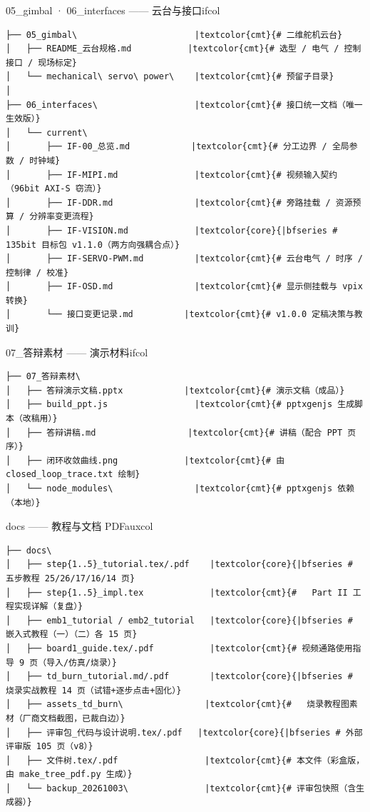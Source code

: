 \documentclass[10pt]{ctexart}
\begin{document}
\vspace{2.2mm}
\begin{sectbox}{05\_gimbal · 06\_interfaces —— 云台与接口}{ifcol}
\begin{Verbatim}[fontsize=\scriptsize, commandchars=\|\{\}]
├── 05_gimbal\                       |textcolor{cmt}{# 二维舵机云台}
│   ├── README_云台规格.md           |textcolor{cmt}{# 选型 / 电气 / 控制接口 / 现场标定}
│   └── mechanical\ servo\ power\    |textcolor{cmt}{# 预留子目录}
│
├── 06_interfaces\                   |textcolor{cmt}{# 接口统一文档（唯一生效版）}
│   └── current\
│       ├── IF-00_总览.md            |textcolor{cmt}{# 分工边界 / 全局参数 / 时钟域}
│       ├── IF-MIPI.md               |textcolor{cmt}{# 视频输入契约（96bit AXI-S 窃流）}
│       ├── IF-DDR.md                |textcolor{cmt}{# 旁路挂载 / 资源预算 / 分辨率变更流程}
│       ├── IF-VISION.md             |textcolor{core}{|bfseries # 135bit 目标包 v1.1.0（两方向强耦合点）}
│       ├── IF-SERVO-PWM.md          |textcolor{cmt}{# 云台电气 / 时序 / 控制律 / 校准}
│       ├── IF-OSD.md                |textcolor{cmt}{# 显示侧挂载与 vpix 转换}
│       └── 接口变更记录.md          |textcolor{cmt}{# v1.0.0 定稿决策与教训}
\end{Verbatim}
\end{sectbox}
\vspace{2.2mm}
\begin{sectbox}{07\_答辩素材 —— 演示材料}{ifcol}
\begin{Verbatim}[fontsize=\scriptsize, commandchars=\|\{\}]
├── 07_答辩素材\
│   ├── 答辩演示文稿.pptx            |textcolor{cmt}{# 演示文稿（成品）}
│   ├── build_ppt.js                 |textcolor{cmt}{# pptxgenjs 生成脚本（改稿用）}
│   ├── 答辩讲稿.md                  |textcolor{cmt}{# 讲稿（配合 PPT 页序）}
│   ├── 闭环收敛曲线.png             |textcolor{cmt}{# 由 closed_loop_trace.txt 绘制}
│   └── node_modules\                |textcolor{cmt}{# pptxgenjs 依赖（本地）}
\end{Verbatim}
\end{sectbox}
\vspace{2.2mm}
\begin{sectbox}{docs —— 教程与文档 PDF}{auxcol}
\begin{Verbatim}[fontsize=\scriptsize, commandchars=\|\{\}]
├── docs\
│   ├── step{1..5}_tutorial.tex/.pdf    |textcolor{core}{|bfseries # 五步教程 25/26/17/16/14 页}
│   ├── step{1..5}_impl.tex             |textcolor{cmt}{#   Part II 工程实现详解（复盘）}
│   ├── emb1_tutorial / emb2_tutorial   |textcolor{core}{|bfseries # 嵌入式教程（一）（二）各 15 页}
│   ├── board1_guide.tex/.pdf           |textcolor{cmt}{# 视频通路使用指导 9 页（导入/仿真/烧录）}
│   ├── td_burn_tutorial.md/.pdf        |textcolor{core}{|bfseries # 烧录实战教程 14 页（试错+逐步点击+固化）}
│   ├── assets_td_burn\                |textcolor{cmt}{#   烧录教程图素材（厂商文档截图，已裁白边）}
│   ├── 评审包_代码与设计说明.tex/.pdf   |textcolor{core}{|bfseries # 外部评审版 105 页（v8）}
│   ├── 文件树.tex/.pdf                 |textcolor{cmt}{# 本文件（彩盒版，由 make_tree_pdf.py 生成）}
│   └── backup_20261003\               |textcolor{cmt}{# 评审包快照（含生成器）}
\end{Verbatim}
\end{sectbox}
\end{document}
